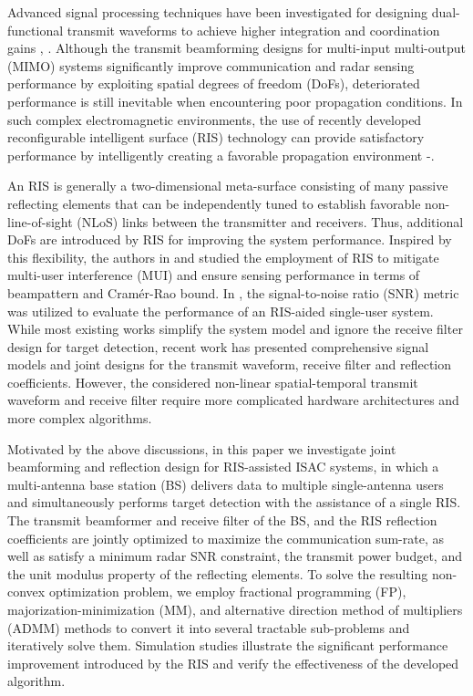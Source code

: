 \documentclass[Conference,a4paper]{IEEEtran}
\begin{document}
Advanced signal processing techniques have been investigated for designing dual-functional transmit waveforms to achieve higher integration and coordination gains \cite{Zhang-JSTSP-2021}, \cite{Liu-TSP-2020}.
Although the transmit beamforming designs for multi-input multi-output (MIMO) systems significantly improve communication and radar sensing performance by exploiting spatial degrees of freedom (DoFs), deteriorated performance is still inevitable when encountering poor propagation conditions.
In such complex electromagnetic environments, the use of recently developed reconfigurable intelligent surface (RIS) technology can provide satisfactory performance by intelligently creating a favorable propagation environment \cite{Renzo-JSAC-2020}-\cite{Wu-TWC-2019}.



An RIS is generally a two-dimensional meta-surface consisting of many passive reflecting elements that can be independently tuned to establish favorable non-line-of-sight (NLoS) links between the transmitter and receivers.
Thus, additional DoFs are introduced by RIS for improving the system performance.
Inspired by this flexibility, the authors in \cite{Wang-TVT-2021a} and \cite{Wang-TVT-2021b} studied the employment of RIS to mitigate multi-user interference (MUI) and ensure sensing performance in terms of beampattern and Cram\'{e}r-Rao bound.
In \cite{Jiang-SJ-2021}, the signal-to-noise ratio (SNR) metric was utilized to evaluate the performance of an RIS-aided single-user system.
While most existing works simplify the system model and ignore the receive filter design for target detection, recent work \cite{Liu-2021} has presented comprehensive signal models and joint designs for the transmit waveform, receive filter and reflection coefficients.
However, the considered non-linear spatial-temporal transmit waveform and receive filter require more complicated hardware architectures and more complex algorithms.



Motivated by the above discussions, in this paper we investigate joint beamforming and reflection design for RIS-assisted ISAC systems, in which a multi-antenna base station (BS) delivers data to multiple single-antenna users and simultaneously performs target detection with the assistance of a single RIS.
The transmit beamformer and receive filter of the BS, and the RIS reflection coefficients are jointly optimized to maximize the communication sum-rate, as well as satisfy a minimum radar SNR constraint, the transmit power budget, and the unit modulus property of the reflecting elements.
To solve the resulting non-convex optimization problem, we employ fractional programming (FP), majorization-minimization (MM), and alternative direction method of multipliers (ADMM) methods to convert it into several tractable sub-problems and iteratively solve them.
Simulation studies illustrate the significant performance improvement introduced by the RIS and verify the effectiveness of the developed algorithm.
\end{document}
